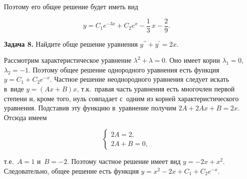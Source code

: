 \noindent
Поэтому его общее решение будет иметь вид

\begin{equation*}
y = C_{1}e^{-3x} + C_{2}e^{x} - \dfrac{1}{3} \, x - \dfrac{2}{9}.
\end{equation*}

\textbf{Задача 8.}\label{ex:6_5_8} Найдите обще решение уравнения
$y^{\prime\prime} + y^\prime = 2x$.

Рассмотрим характеристическое уравнение $\lambda^{2} + \lambda = 0$.
Оно имеет корни $\lambda_{1} = 0$, $\lambda_{2} = -1$. Поэтому общее решение
однородного уравнения есть функция $y = C_{1} + C_{2}e^{-x}$. Частное решение
неоднородного уравнения следует искать в~виде $y = (Ax + B)x$, т.к.\ правая часть
уравнения есть многочлен первой степени и, кроме того, нуль совпадает с~одним из корней
характеристического уравнения. Подставив эту функцию в~уравнение получим
$2A + 2Ax + B = 2x$. Отсюда имеем

\begin{equation*}
\begin{cases}
2A = 2, \\
2A + B = 0,
\end{cases}
\end{equation*}

\noindent
т.е.\ $A = 1$ и~$B = -2$. Поэтому частное решение имеет вид $y = -2x + x^{2}$.
Следовательно, общее решение есть функция 
$y = x^{2} - 2x + C_{1} + C_{2}e^{-x}$.

